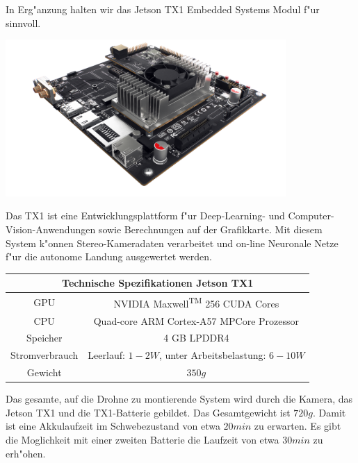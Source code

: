\documentclass[a4paper]{article}
\begin{document}
In Erg"anzung halten wir das Jetson TX1 Embedded Systems Modul f"ur sinnvoll.
\begin{center}
\includegraphics[width=0.8\textwidth]{JetsonTX1.png}
\end{center}
Das TX1 ist eine Entwicklungsplattform f"ur Deep-Learning- und Computer-Vision-Anwendungen sowie Berechnungen auf der Grafikkarte. Mit diesem System k"onnen Stereo-Kameradaten verarbeitet und on-line Neuronale Netze f"ur die autonome Landung ausgewertet werden.
\begin{center}
\begin{tabular}{ c | c }
\hline
\multicolumn{2}{c}{Technische Spezifikationen Jetson TX1}\\
\hline
GPU & NVIDIA Maxwell\textsuperscript{TM} 256 CUDA Cores\\
CPU & Quad-core ARM Cortex-A57 MPCore Prozessor\\
Speicher & 4 GB LPDDR4 \\
Stromverbrauch & Leerlauf: $1-2W$, unter Arbeitsbelastung: $6-10W$\\
Gewicht & $350g$
\end{tabular}
\end{center}
Das gesamte, auf die Drohne zu montierende System wird durch die Kamera, das Jetson TX1 und die TX1-Batterie gebildet. Das Gesamtgewicht ist $720g$. Damit ist eine Akkulaufzeit im Schwebezustand von etwa $20 min$ zu erwarten. Es gibt die Moglichkeit mit einer zweiten Batterie die Laufzeit von etwa $30 min$ zu erh"ohen.
\end{document}
